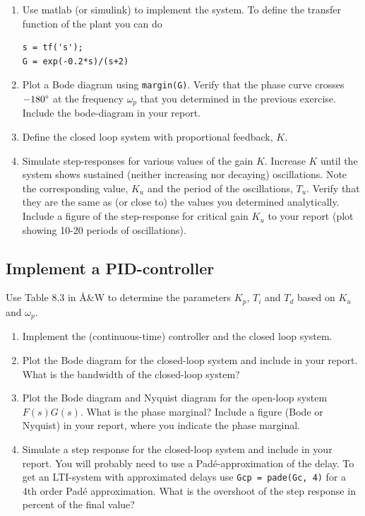 \documentclass{scrartcl}
\begin{document}
\begin{enumerate}
\item Use matlab (or simulink) to implement the system. To define the transfer function of the plant you can do

\begin{verbatim}
s = tf('s');
G = exp(-0.2*s)/(s+2)
\end{verbatim}
\item Plot a Bode diagram using \texttt{margin(G)}. Verify that the phase curve crosses $-180\degree$ at the frequency $\omega_p$ that you determined in the previous exercise. Include the bode-diagram in your report.
\item Define the closed loop system with proportional feedback, $K$.
\item Simulate step-responses for various values of the gain $K$. Increase  $K$ until the system shows sustained (neither increasing nor decaying) oscillations. Note the corresponding value, $K_u$ and the period of the oscillations, $T_u$. Verify that they are the same as (or close to) the values you determined analytically. Include a figure of the step-response for critical gain $K_u$ to your report (plot showing 10-20 periods of oscillations).
\end{enumerate}
 
 
\subsection{Implement a PID-controller}
\label{sec-1-3}

   Use Table 8.3 in Å\&W to determine the parameters $K_p$, $T_i$ and $T_d$ based on $K_u$ and $\omega_p$. 
\begin{enumerate}
\item Implement the (continuous-time) controller and the closed loop system.
\item Plot the Bode diagram for the closed-loop system and include in your report. What is the bandwidth of the closed-loop system?
\item Plot the Bode diagram and Nyquist diagram for the open-loop system $F(s)G(s)$. What is the phase marginal? Include a figure (Bode or Nyquist) in your report, where you indicate the phase marginal.
\item Simulate a step response for the closed-loop system and include in your report. You will probably need to use a Padé-approximation of the delay. To get an LTI-system with approximated delays use \texttt{Gcp = pade(Gc, 4)} for a 4th order Padé approximation. What is the overshoot of the step response in percent of the final value?
\end{enumerate}
\end{document}
